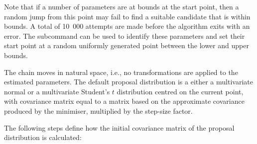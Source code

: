 Note that if a number of parameters are at bounds at the start point, then a random jump from this point may fail to find a suitable candidate that is within bounds. A total of 10~000 attempts are made before the algorithm exits with an error. The subcommand  {} can be used to identify these parameters and set their start point at a random uniformly generated point between the lower and upper bounds.

The chain moves in natural space, i.e., no transformations are applied to the estimated parameters. The default proposal distribution is a either  a multivariate normal or a multivariate Student's $t$ distribution centred on the current point, with covariance matrix equal to a matrix based on the approximate covariance produced by the minimiser, multiplied by the step-size factor.

The following steps define how the initial covariance matrix of the proposal distribution is calculated:

